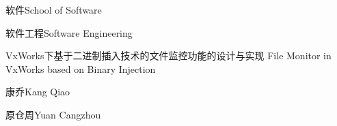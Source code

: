 
\school
{软件}{School of Software}

\major
{软件工程}{Software Engineering}

\thesistitle
{VxWorks下基于二进制插入技术的文件监控功能的设计与实现}
{}
{File Monitor in VxWorks based on Binary Injection}
{}

\thesisauthor
{康乔}{Kang Qiao}

\teacher
{ 原仓周}{Yuan Cangzhou}







